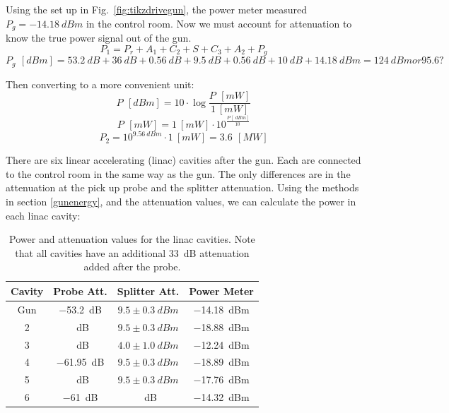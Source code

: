 \documentclass{iitthesis}
\begin{document}
\fi

Using the set up in Fig.~\ref{fig:tikzdrivegun}, the power meter measured  $P_{g} = \SI{-14.18}{dBm}$
in the control room. Now we must account for attenuation to know the true power
signal out of the gun. 
\begin{equation}
P_1 = P_r + A_1 + C_2 + S + C_3 + A_2 + P_g
\end{equation}
\begin{equation}
P_g \, \SI{}{[dBm]} = \SI{53.2}{dB} + \SI{36}{dB} + \SI{0.56}{dB} + \SI{9.5}{dB}+ \SI{0.56}{dB} + \SI{10}{dB} + \SI{14.18}{dBm} = \SI{124}{dBm} or 95.6?
\end{equation}

Then converting to a more convenient unit: 
\begin{equation}
P \, \SI{}{[dBm]} = 10 \cdot \log{\frac{P \, \SI{}{[mW]}}{\SI{1}{[mW]}}}
\end{equation}
\begin{equation} \label{eq:dbmtomw}
P \, \SI{}{[mW]} = \SI{1}{[mW]} \cdot 10^{\frac{P \, [\SI{}{dBm}]}{\SI{10}{}}}
\end{equation}
\begin{equation} 
P_2 = 10^{\SI{9.56}{dBm}} \cdot  \SI{1}{[mW]} = 3.6 \, \SI{}{[MW]} 
\end{equation}

There are six linear accelerating (linac) cavities after the gun. 
Each are connected to the control room in the same way as the gun. 
The only differences are in the attenuation at the pick up probe and 
the splitter attenuation. Using the methods in section \ref{gunenergy}, 
and the attenuation values, we can calculate the power in each linac cavity:

\begin{table} %
	\caption{\label{tab:powerlinac} Power and attenuation values for the 
		linac cavities. Note that all cavities have an additional 
		\SI{33}{dB} attenuation added after the probe.}
	\begin{center}
		\begin{tabular}{cccc}
			\toprule
			\textbf{Cavity} & \textbf{Probe Att.} & \textbf{Splitter Att.} & \textbf{Power Meter} \\
			\midrule
			Gun & \SI{-53.2}{dB}& $9.5 \pm \SI{0.3}{dBm}$ & \SI{-14.18}{dBm}\\
			2 & \SI{}{dB}       & $9.5 \pm \SI{0.3}{dBm}$ & \SI{-18.88}{dBm}\\
			3 & \SI{}{dB}       & $4.0 \pm \SI{1.0}{dBm}$ & \SI{-12.24}{dBm}\\
			4 & \SI{-61.95}{dB} & $9.5 \pm \SI{0.3}{dBm}$ & \SI{-18.89}{dBm} \\
			5 & \SI{}{dB}       & $9.5 \pm \SI{0.3}{dBm}$ & \SI{-17.76}{dBm}\\
			6 & \SI{-61}{dB}    & \SI{}{dB} & \SI{-14.32}{dBm}\\
			\bottomrule
		\end{tabular}
	\end{center}
\end{table}
\end{document}
